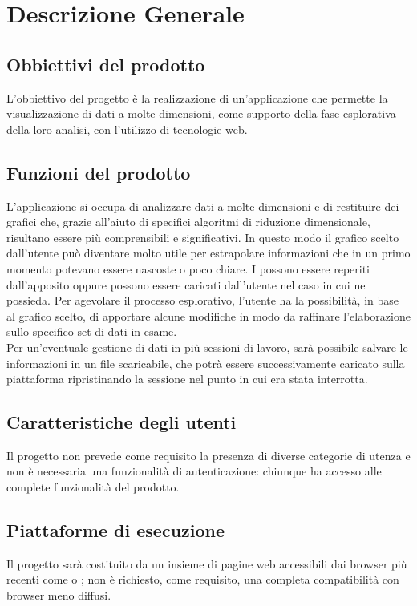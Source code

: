 \section{Descrizione Generale}
\subsection{Obbiettivi del prodotto}
L'obbiettivo del progetto è la realizzazione di un'applicazione che permette la visualizzazione di dati a molte dimensioni, come supporto della fase esplorativa della loro analisi, con l'utilizzo di tecnologie web.
\subsection{Funzioni del prodotto}
L'applicazione si occupa di analizzare dati a molte dimensioni e di restituire dei grafici che, grazie all'aiuto di specifici algoritmi di riduzione dimensionale, risultano essere più comprensibili e significativi. In questo modo il grafico scelto dall'utente può diventare molto utile per estrapolare informazioni che in un primo momento potevano essere nascoste o poco chiare. I  possono essere reperiti dall'apposito  oppure possono essere caricati dall'utente nel caso in cui ne possieda. Per agevolare il processo esplorativo, l'utente ha la possibilità, in base al grafico scelto, di apportare alcune modifiche in modo da raffinare l'elaborazione sullo specifico set di dati in esame.\\ Per un'eventuale gestione di dati in più sessioni di lavoro, sarà possibile salvare le informazioni in un file scaricabile, che potrà essere successivamente caricato sulla piattaforma ripristinando la sessione nel punto in cui era stata interrotta.
\subsection{Caratteristiche degli utenti}
Il progetto non prevede come requisito la presenza di diverse categorie di utenza e non è necessaria una funzionalità di autenticazione: chiunque ha accesso alle complete funzionalità del prodotto. 
\subsection{Piattaforme di esecuzione}
Il progetto sarà costituito da un insieme di pagine web accessibili dai browser più recenti come  o ; non è richiesto, come requisito, una completa compatibilità con browser meno diffusi.
